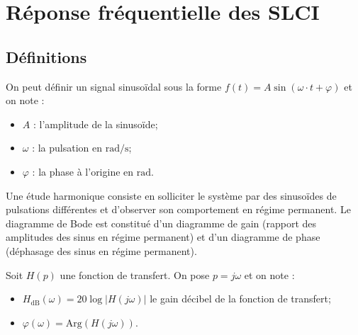 \section{Réponse fréquentielle des SLCI}
\subsection{Définitions}


On peut définir un signal sinusoïdal sous la forme $
f(t)=A \sin(\omega \cdot t + \varphi)
$ et on note :



\begin{itemize}
\item $A$ : l'amplitude de la sinusoïde;
\item $\omega$ : la pulsation en $\text{rad/s}$;
\item $\varphi$ : la phase à l'origine en $\text{rad}$.
\end{itemize}


Une étude harmonique consiste en solliciter le système par des sinusoïdes de pulsations différentes et d'observer son comportement en régime permanent. Le diagramme de Bode est constitué d'un diagramme de gain (rapport des amplitudes des sinus en régime permanent) et d'un diagramme de phase (déphasage des sinus en régime permanent). 

\begin{defi}
Soit $H(p)$ une fonction de transfert. On pose $p=j\omega$ et on note :  
\begin{itemize}
\item $H_{\text{dB}}\left( \omega\right) =20\log |H(j\omega)|$ le gain décibel de la fonction de transfert;
\item $\varphi\left( \omega\right) = \text{Arg}\left(H(j\omega) \right)$.
\end{itemize}
\end{defi}

